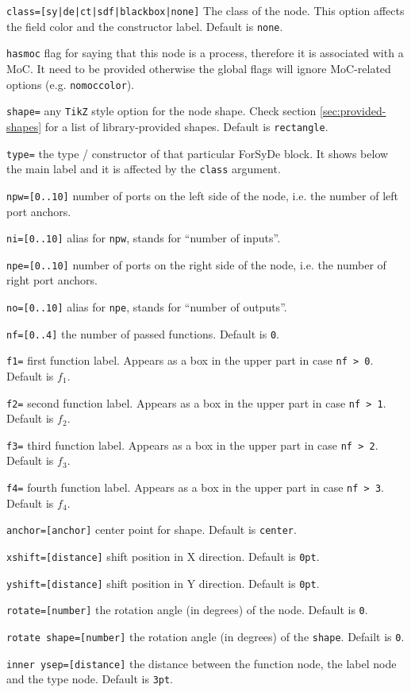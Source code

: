 \documentclass[10pt]{article}
\newenvironment{optionslist}[0]{ 
\begin{list}{}{
	\setlength{\itemindent}{-10pt}
	\setlength{\itemsep}{0pt}
	\setlength{\parsep}{0pt}
}}{\end{list}}
\begin{document}
\begin{optionslist}
\item \texttt{class=[sy|de|ct|sdf|blackbox|none]} The class of the node. This option affects the field color and the constructor label. Default is \texttt{none}.
\item \texttt{hasmoc} flag for saying that this node is a process, therefore it is associated with a MoC. It need to be provided otherwise the global flags will ignore MoC-related options (e.g. \texttt{nomoccolor}).
\item \texttt{shape=} any \texttt{TikZ} style option for the node shape. Check section \ref{sec:provided-shapes} for a list of library-provided shapes. Default is \texttt{rectangle}.
\item \texttt{type=} the type / constructor of that particular ForSyDe block. It shows below the main label and it is affected by the \texttt{class} argument.
\item \texttt{npw=[0..10]} number of ports on the left side of the node, i.e. the number of left port anchors.
\item \texttt{ni=[0..10]} alias for \texttt{npw}, stands for ``number of inputs''.
\item \texttt{npe=[0..10]} number of ports on the right side of the node, i.e. the number of right port anchors.
\item \texttt{no=[0..10]} alias for \texttt{npe}, stands for ``number of outputs''.
\item \texttt{nf=[0..4]} the number of passed functions. Default is \texttt{0}.
\item \texttt{f1=} first function label. Appears as a box in the upper part in case \texttt{nf > 0}. Default is $f_1$.
\item \texttt{f2=} second function label. Appears as a box in the upper part in case \texttt{nf > 1}. Default is $f_2$.
\item \texttt{f3=} third function label. Appears as a box in the upper part in case \texttt{nf > 2}. Default is $f_3$.
\item \texttt{f4=} fourth function label. Appears as a box in the upper part in case \texttt{nf > 3}. Default is $f_4$.
\item \texttt{anchor=[anchor]} center point for shape. Default is \texttt{center}.
\item \texttt{xshift=[distance]} shift position in X direction. Default is \texttt{0pt}.
\item \texttt{yshift=[distance]} shift position in Y direction. Default is \texttt{0pt}.
\item \texttt{rotate=[number]} the rotation angle (in degrees) of the node. Default is \texttt{0}.
\item \texttt{rotate shape=[number]} the rotation angle (in degrees) of the \texttt{shape}. Defailt is \texttt{0}.
\item \texttt{inner ysep=[distance]} the distance between the function node, the label node and the type node. Default is \texttt{3pt}.
\end{optionslist}
\end{document}
